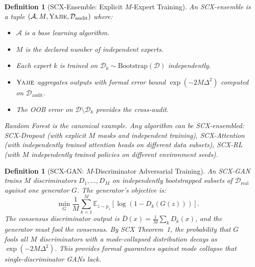\documentclass[12pt,a4paper]{article}
\newtheorem{definition}[theorem]{Definition}
\theoremstyle{definition}
\newcommand{\Yajie}{\textsc{Yajie}}
\newcommand{\SCX}{\textsc{SCX}}
\newcommand{\E}{\mathbb{E}}
\newcommand{\cA}{\mathcal{A}}
\newcommand{\cD}{\mathcal{D}}
\begin{document}
\begin{definition}[SCX-Ensemble: Explicit $M$-Expert Training]\label{def:scx_ensemble}
An \SCX{}-ensemble is a tuple $(\cA, M, \Yajie, \cD_{\text{audit}})$ where:
\begin{itemize}[nosep]
    \item $\cA$ is a base learning algorithm.
    \item $M$ is the declared number of independent experts.
    \item Each expert $k$ is trained on $\cD_k \sim \text{Bootstrap}(\cD)$ independently.
    \item $\Yajie$ aggregates outputs with formal error bound $\exp(-2M\Delta^2)$ computed on $\cD_{\text{audit}}$.
    \item The OOB error on $\cD \setminus \cD_k$ provides the cross-audit.
\end{itemize}
Random Forest is the canonical example. Any algorithm can be \SCX{}-ensembled: SCX-Dropout (with explicit $M$ masks and independent training), SCX-Attention (with independently trained attention heads on different data subsets), SCX-RL (with $M$ independently trained policies on different environment seeds).
\end{definition}

\begin{definition}[SCX-GAN: $M$-Discriminator Adversarial Training]\label{def:scx_gan}
An \SCX{}-GAN trains $M$ discriminators $D_1, \ldots, D_M$ on independently bootstrapped subsets of $\cD_{\text{real}}$ against one generator $G$. The generator's objective is:
\begin{equation}\label{eq:scx_gan_objective}
    \min_G \frac{1}{M}\sum_{k=1}^M \E_{z \sim p_z}[\log(1 - D_k(G(z)))].
\end{equation}
The consensus discriminator output is $\bar{D}(x) = \frac{1}{M}\sum_k D_k(x)$, and the generator must fool the consensus. By \SCX{} Theorem~1, the probability that $G$ fools all $M$ discriminators with a mode-collapsed distribution decays as $\exp(-2M\Delta^2)$. This provides formal guarantees against mode collapse that single-discriminator GANs lack.
\end{definition}
\end{document}
